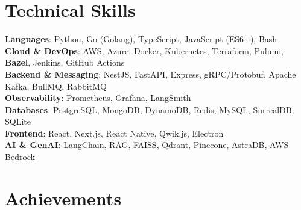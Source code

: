 \documentclass[letterpaper,10pt]{article}
\begin{document}
\section{Technical Skills}
 \begin{itemize}[leftmargin=0.15in, label={}]
    \small{\item{
     \textbf{Languages}{: Python, Go (Golang), TypeScript, JavaScript (ES6+), Bash} \\
     \textbf{Cloud \& DevOps}{: AWS, Azure, Docker, Kubernetes, Terraform, Pulumi, \textbf{Bazel}, Jenkins, GitHub Actions} \\
     \textbf{Backend \& Messaging}{: NestJS, FastAPI, Express, gRPC/Protobuf, Apache Kafka, BullMQ, RabbitMQ} \\
     \textbf{Observability}{: Prometheus, Grafana, LangSmith} \\
     \textbf{Databases}{: PostgreSQL, MongoDB, DynamoDB, Redis, MySQL, SurrealDB, SQLite} \\
     \textbf{Frontend}{: React, Next.js, React Native, Qwik.js, Electron} \\
     \textbf{AI \& GenAI}{: LangChain, RAG, FAISS, Qdrant, Pinecone, AstraDB, AWS Bedrock}
    }}
 \end{itemize}

\section{Achievements}
\begin{itemize}[leftmargin=0.15in]
\end{itemize}
\end{document}
